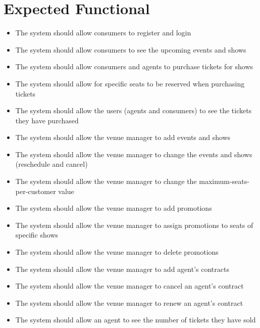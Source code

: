 \section{Expected Functional}

\begin{itemize} %
  \item The system should allow consumers to register and login
  \item The system should allow consumers to see the upcoming events and shows
  \item The system should allow consumers and agents to purchase tickets for shows
  \item The system should allow for specific seats to be reserved when purchasing tickets
  \item The system should allow the users (agents and consumers) to see the tickets they have purchased
  \item The system should allow the venue manager to add events and shows
  \item The system should allow the venue manager to change the events and shows (reschedule and cancel)
  \item The system should allow the venue manager to change the maximum-seats-per-customer value
  \item The system should allow the venue manager to add promotions
  \item The system should allow the venue manager to assign promotions to seats of specific shows
  \item The system should allow the venue manager to delete promotions
  \item The system should allow the venue manager to add agent's contracts
  \item The system should allow the venue manager to cancel an agent's contract
  \item The system should allow the venue manager to renew an agent's contract
  \item The system should allow an agent to see the number of tickets they have sold
\end{itemize}
